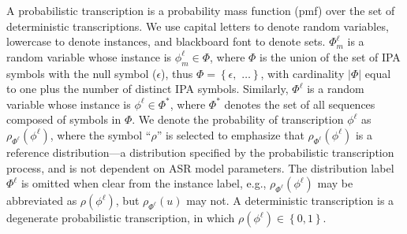 A probabilistic transcription is a probability mass function (pmf)
over the set of deterministic transcriptions.  We use capital letters
to denote random variables, lowercase to denote instances, and
blackboard font to denote sets.  $\Phi^{\ell}_m$ is a random variable
whose instance is $\phi_m^\ell\in\mathbb{\Phi}$, where $\mathbb{\Phi}$
is the union of the set of IPA symbols with the null symbol
($\epsilon$), thus $\mathbb{\Phi} =\left\{\right.\epsilon,$
\ipa{[a],[i],[2],[\ae],}$\left.\ldots\right\}$, with cardinality
$|\mathbb{\Phi}|$ equal to one plus the number of distinct IPA
symbols.  Similarly, $\Phi^{\ell}$ is a random variable whose instance
is $\phi^{\ell}\in\mathbb{\Phi}^*$, where $\mathbb{\Phi}^*$ denotes
the set of all sequences composed of symbols in $\mathbb{\Phi}$.  We
denote the probability of transcription $\phi^{\ell}$ as
$\rho_{\Phi^\ell}(\phi^{\ell})$, where the symbol ``$\rho$'' is
selected to emphasize that $\rho_{\Phi^\ell}(\phi^{\ell})$ is a
reference distribution---a distribution specified by the probabilistic
transcription process, and is not dependent on ASR model
parameters.  The distribution label $\Phi^\ell$ is omitted when clear
from the instance label, e.g., $\rho_{\Phi^\ell}(\phi^\ell)$ may be
abbreviated as $\rho(\phi^\ell)$, but $\rho_{\Phi^\ell}(u)$ may not.
A deterministic transcription is a degenerate probabilistic
transcription, in which $\rho(\phi^\ell)\in\left\{0,1\right\}$.

